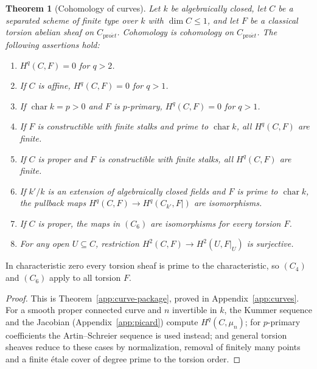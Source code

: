 \documentclass[11pt,a4paper]{article}
\numberwithin{equation}{section}
\newtheorem{theorem}{Theorem}[section]
\theoremstyle{definition}
\theoremstyle{remark}
\newcommand{\proet}{\mathrm{pro}\acute{e}t}
\begin{document}
\begin{theorem}[Cohomology of curves]
\label{pbc:curve-input}
Let $k$ be algebraically closed, let $C$ be a separated scheme of finite
type over $k$ with $\dim C\leq1$, and let $F$ be a classical torsion
abelian sheaf on $C_{\proet}$. Cohomology is cohomology on
$C_{\proet}$. The following assertions hold:
\begin{enumerate}[label=$(C_{\arabic*})$,leftmargin=3.5em]
\item $H^q(C,F)=0$ for $q>2$.
\item If $C$ is affine, $H^q(C,F)=0$ for $q>1$.
\item If $\operatorname{char}k=p>0$ and $F$ is $p$-primary,
  $H^q(C,F)=0$ for $q>1$.
\item If $F$ is constructible with finite stalks and prime to
  $\operatorname{char}k$, all $H^q(C,F)$ are finite.
\item If $C$ is proper and $F$ is constructible with finite stalks,
  all $H^q(C,F)$ are finite.
\item If $k'/k$ is an extension of algebraically closed fields and $F$
  is prime to $\operatorname{char}k$, the pullback maps
  $H^q(C,F)\to H^q(C_{k'},F|)$ are isomorphisms.
\item If $C$ is proper, the maps in $(C_6)$ are isomorphisms for every
  torsion $F$.
\item For any open $U\subseteq C$, restriction
  $H^2(C,F)\to H^2(U,F|_U)$ is surjective.
\end{enumerate}
\end{theorem}

In characteristic zero every torsion sheaf is prime to the
characteristic, so $(C_4)$ and $(C_6)$ apply to all torsion $F$.

\begin{proof}
This is Theorem~\ref{app:curve-package}, proved in
Appendix~\ref{app:curves}. For a smooth proper connected curve and $n$
invertible in $k$, the Kummer sequence and the Jacobian
(Appendix~\ref{app:picard}) compute $H^q(C,\mu_n)$; for $p$-primary
coefficients the Artin--Schreier sequence is used instead; and general
torsion sheaves reduce to these cases by normalization, removal of
finitely many points and a finite \'etale cover of degree prime to the
torsion order.
\end{proof}
\end{document}
